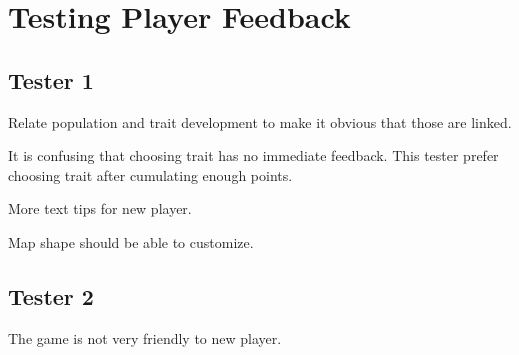 \section{Testing Player Feedback}

\subsection{Tester 1}
Relate population and trait development to make it obvious that those are linked.

It is confusing that choosing trait has no immediate feedback. This tester prefer choosing trait after cumulating enough points.

More text tips for new player.

Map shape should be able to customize.

\subsection{Tester 2}
The game is not very friendly to new player.